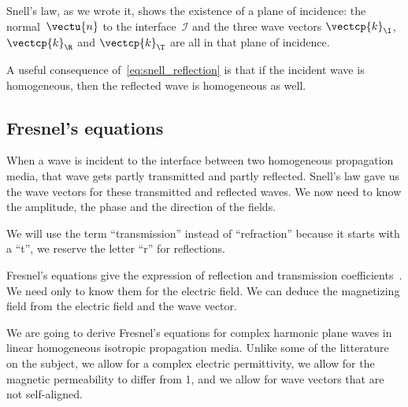 Snell's law, as we wrote it, shows the existence of a plane of incidence: the normal~$\vectu{n}$ to the interface~$\mathcal{I}$ and the three wave vectors $\vectcp{k}_\I$, $\vectcp{k}_\R$ and $\vectcp{k}_\T$ are all in that plane of incidence.

A useful consequence of~\cref{eq:snell_reflection} is that if the incident wave is homogeneous, then the reflected wave is homogeneous as well.







\subsection{Fresnel's equations}

When a wave is incident to the interface between two homogeneous propagation media, that wave gets partly transmitted and partly reflected.
Snell's law gave us the wave vectors for these transmitted and reflected waves.
We now need to know the amplitude, the phase and the direction of the fields.

We will use the term ``transmission'' instead of ``refraction'' because it starts with a ``t'', we reserve the letter ``r'' for reflections.

Fresnel's equations give the expression of reflection and transmission coefficients~\cite{hecht2002optics}.
We need only to know them for the electric field.
We can deduce the magnetizing field from the electric field and the wave vector.

We are going to derive Fresnel's equations for complex harmonic plane waves in linear homogeneous isotropic propagation media.
Unlike some of the litterature on the subject, we allow for a complex electric permittivity, we allow for the magnetic permeability to differ from 1, and we allow for wave vectors that are not self-aligned.

